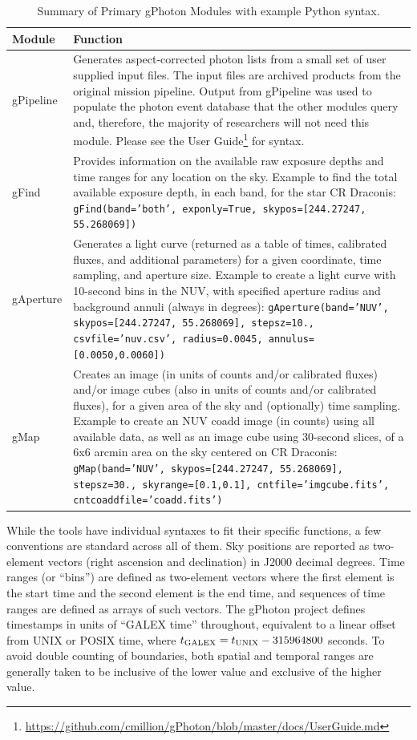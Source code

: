 \documentclass[preprint]{aastex}
\begin{document}
\begin{table}[h]
\begin{tabular}{|L{2cm}|L{13cm}|}
\hline
	{\bf Module} & {\bf Function}\\\hline
	gPipeline & Generates aspect-corrected photon lists from a small set of user supplied input files. The input files are archived products from the original mission pipeline. Output from gPipeline was used to populate the photon event database that the other modules query and, therefore, the majority of researchers will not need this module. Please see the User Guide\footnote{\url{https://github.com/cmillion/gPhoton/blob/master/docs/UserGuide.md}} for syntax.\\\hline
	gFind & Provides information on the available raw exposure depths and time ranges for any location on the sky. Example to find the total available exposure depth, in each band, for the star CR Draconis: \parbox[t]{13cm}{\texttt{gFind(band='both', exponly=True, skypos=[244.27247, 55.268069])}}\\\hline
	gAperture & Generates a light curve (returned as a table of times, calibrated fluxes, and additional parameters) for a given coordinate, time sampling, and aperture size. Example to create a light curve with 10-second bins in the NUV, with specified aperture radius and background annuli (always in degrees): \parbox[t]{13cm}{\texttt{gAperture(band='NUV', skypos=[244.27247, 55.268069], stepsz=10., csvfile='nuv.csv', radius=0.0045, annulus=[0.0050,0.0060])}}\\\hline
	gMap & Creates an image (in units of counts and/or calibrated fluxes) and/or image cubes (also in units of counts and/or calibrated fluxes), for a given area of the sky and (optionally) time sampling. Example to create an NUV coadd image (in counts) using all available data, as well as an image cube using 30-second slices, of a 6x6 arcmin area on the sky centered on CR Draconis: \parbox[t]{13cm}{\texttt{gMap(band='NUV', skypos=[244.27247, 55.268069], stepsz=30., skyrange=[0.1,0.1], cntfile='imgcube.fits', cntcoaddfile='coadd.fits')}}\\\hline
\end{tabular}
\caption{Summary of Primary gPhoton Modules with example Python syntax.}
\label{moduledesc}
\end{table}

While the tools have individual syntaxes to fit their specific functions, a few conventions are standard across all of them. Sky positions are reported as two-element vectors (right ascension and declination) in J2000 decimal degrees. Time ranges (or ``bins'') are defined as two-element vectors where the first element is the start time and the second element is the end time, and sequences of time ranges are defined as arrays of such vectors. The gPhoton project defines timestamps in units of ``GALEX time'' throughout, equivalent to a linear offset from UNIX or POSIX time, where $t_{\rm{GALEX}} = t_{\rm{UNIX}} - 315964800$ seconds. To avoid double counting of boundaries, both spatial and temporal ranges are generally taken to be inclusive of the lower value and exclusive of the higher value.
\end{document}

